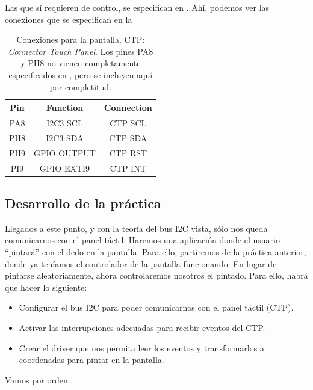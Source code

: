 \documentclass[../main.tex]{subfiles}
\begin{document}
            Las que sí requieren de control, se especifican en \BRDMAN[Appendix A]. Ahí, podemos ver las conexiones que se especifican en la 

            \begin{table}[h]
                \centering
                \begin{tabular}{c|c|c}
                    Pin & Function & Connection \\\hline\hline
                    PA8 & I2C3 SCL & CTP SCL \\
                    PH8 & I2C3 SDA & CTP SDA \\
                    PH9 & GPIO OUTPUT & CTP RST \\ 
                    PI9 & GPIO EXTI9 & CTP INT \\
                \end{tabular}
                \caption{Conexiones para la pantalla. CTP: \emph{Connector Touch Panel}. Los pines PA8 y PH8 no vienen completamente especificados en \BRDMAN, pero se incluyen aquí por completitud.}
                \label{tab:ctp_conn}
            \end{table}

    \subsection{Desarrollo de la práctica}

        Llegados a este punto, y con la teoría del bus I2C vista, sólo nos queda comunicarnos con el panel táctil. Haremos una aplicación donde el usuario ``pintará'' con el dedo en la pantalla. Para ello, partiremos de la práctica anterior, donde ya teníamos el controlador de la pantalla funcionando. En lugar de pintarse aleatoriamente, ahora controlaremos nosotros el pintado. Para ello, habrá que hacer lo siguiente:

        \begin{itemize}
            \item Configurar el bus I2C para poder comunicarnos con el panel táctil (CTP).
            \item Activar las interrupciones adecuadas para recibir eventos del CTP.
            \item Crear el driver que nos permita leer los eventos y transformarlos a coordenadas para pintar en la pantalla.
        \end{itemize}

        Vamos por orden:
\end{document}
